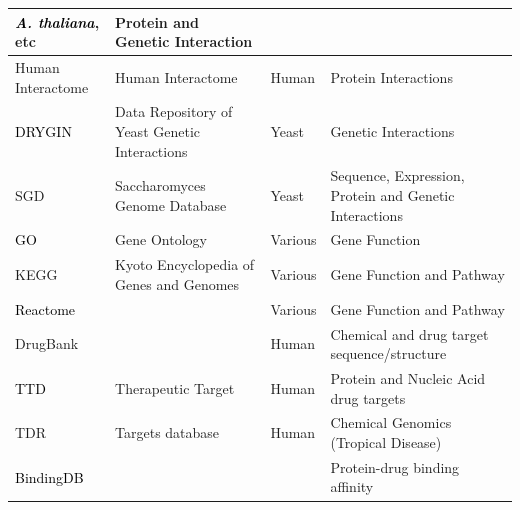 \begin{flushleft}
\begin{supertabular}{m{2.299cm}|m{3.8009999cm}|m{3.552cm}|m{6.5490003cm}}
\color{black} \textit{\textcolor{black}{A. thaliana}}, etc &
\color{black} Protein and
Genetic Interaction\\\hline
Human Interactome &
Human Interactome &
Human &
Protein Interactions\\\hline
{}\color{black}
\textcolor{black}{DRYGIN} &
\color{black} Data
Repository of Yeast Genetic Interactions &
\color{black} Yeast &
\color{black} Genetic
Interactions\\\hline
SGD &
Saccharomyces Genome Database &
Yeast &
Sequence, Expression, Protein and Genetic Interactions\\\hline
{}\color{black}
\textcolor{black}{GO} &
\color{black} Gene
Ontology &
\color{black} Various &
\color{black} Gene
Function\\\hline
KEGG &
Kyoto Encyclopedia of Genes and Genomes &
Various &
Gene Function and Pathway\\\hline
{}\color{black}
\textcolor{black}{Reactome} &
~
 &
\color{black} Various &
\color{black} Gene
Function and Pathway\\\hline
DrugBank &
~
 &
Human &
Chemical and drug target sequence/structure\\\hline
{}\color{black}
\textcolor{black}{TTD} &
\color{black} Therapeutic
Target &
\color{black} Human &
\color{black} Protein and
Nucleic Acid drug targets\\\hline
TDR &
Targets database &
Human &
Chemical Genomics (Tropical Disease)\\\hline
{}\color{black}
\textcolor{black}{BindingDB} &
~
 &
~
 &
\color{black} Protein-drug
binding affinity\\\hline
\end{supertabular}
\end{flushleft}
\fi

